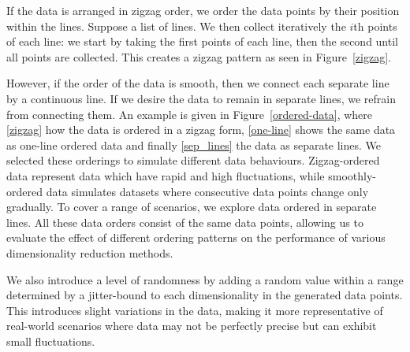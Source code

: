 \documentclass[pdftex,12pt,a4paper]{report}
\begin{document}
If the data is arranged in zigzag order, we order the data points by their position within the lines.
Suppose a list of lines.
We then collect iteratively the $i$th points of each line:
we start by taking the first points of each line, then the second until all points are collected.
This creates a zigzag pattern as seen in Figure~\ref{zigzag}.

However, if the order of the data is smooth, then we connect each separate line by a continuous line.
If we desire the data to remain in separate lines, we refrain from connecting them.
An example is given in Figure~\ref{ordered-data}, where \ref{zigzag} how the data is ordered in a zigzag form, \ref{one-line} shows the same data as one-line ordered data and finally \ref{sep_lines} the data as separate lines.
We selected these orderings to simulate different data behaviours.
Zigzag-ordered data represent data which have rapid and high fluctuations, while smoothly-ordered data simulates datasets where consecutive data points change only gradually.
To cover a range of scenarios, we explore data ordered in separate lines.
All these data orders consist of the same data points, allowing us to evaluate the effect of different ordering patterns on the performance of various dimensionality reduction methods.

We also introduce a level of randomness by adding a random value within a range determined by a jitter-bound to each dimensionality in the generated data points.
This introduces slight variations in the data, making it more representative of real-world scenarios where data may not be perfectly precise but can exhibit small fluctuations.
\end{document}
